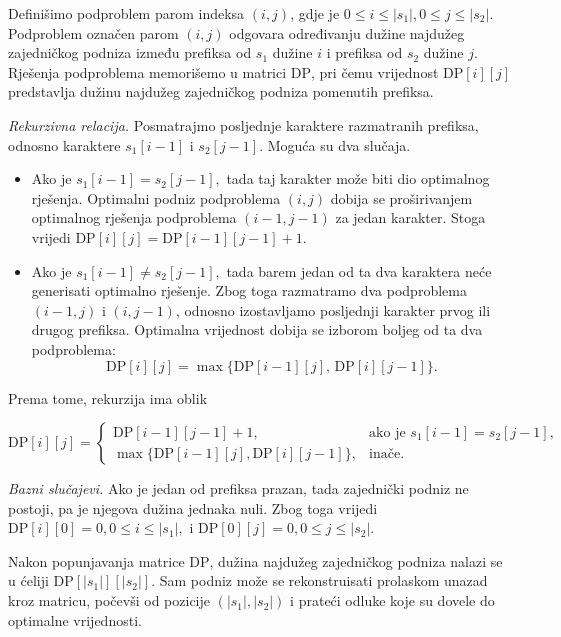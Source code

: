 \begin{solution}
	
	Definišimo podproblem parom indeksa $(i,j)$, gdje je
	$0 \leq i \leq |s_1|, 0 \leq j \leq |s_2|.
	$ 
	Podproblem označen parom $(i,j)$ odgovara određivanju dužine najdužeg zajedničkog podniza između prefiksa od $s_1$ dužine $i$ i prefiksa od $s_2$ dužine $j$.  Rješenja podproblema memorišemo u matrici $\textrm{DP}$, pri čemu vrijednost $\textrm{DP}[i][j]$ predstavlja dužinu najdužeg zajedničkog podniza pomenutih prefiksa.
	
	\medskip
	
	\textit{Rekurzivna relacija.} Posmatrajmo posljednje karaktere razmatranih prefiksa, odnosno karaktere $s_1[i-1]$ i $s_2[j-1]$. Moguća su dva slučaja.
	
	\begin{itemize}
		\item Ako je
		$s_1[i-1]=s_2[j-1],$
		tada taj karakter može biti dio optimalnog rješenja. Optimalni podniz podproblema $(i,j)$ dobija se proširivanjem optimalnog rješenja podproblema $(i-1,j-1)$ za jedan karakter. Stoga vrijedi $\textrm{DP}[i][j]=\textrm{DP}[i-1][j-1]+1.$
		
		\item Ako je $ s_1[i-1]\neq s_2[j-1],$
		tada barem jedan od ta dva karaktera neće generisati optimalno rješenje. Zbog toga razmatramo dva podproblema 
		$ (i-1,j)$ i
		$(i,j-1)$,
		odnosno izostavljamo posljednji karakter prvog ili drugog prefiksa. Optimalna vrijednost dobija se izborom boljeg od ta dva podproblema:
		$$ \textrm{DP}[i][j]
		=
		\max\{\textrm{DP}[i-1][j],\,\textrm{DP}[i][j-1]\}.
		$$
	\end{itemize}
	
	Prema tome, rekurzija ima oblik
	
	$
	\textrm{DP}[i][j]=
	\begin{cases}
		\textrm{DP}[i-1][j-1]+1, & \text{ako je } s_1[i-1]=s_2[j-1], \\
		\max\{\textrm{DP}[i-1][j],\textrm{DP}[i][j-1]\}, & \text{inače}.
	\end{cases}
	$
	
	\medskip
	
	\textit{Bazni slučajevi.} Ako je jedan od prefiksa prazan, tada zajednički podniz ne postoji, pa je njegova dužina jednaka nuli. Zbog toga vrijedi  $\textrm{DP}[i][0]=0,
	  0\leq i\leq |s_1|,$ i $
	\textrm{DP}[0][j]=0,
	0\leq j\leq |s_2|.$
	
	\medskip
	
	Nakon popunjavanja matrice $\textrm{DP}$, dužina najdužeg zajedničkog podniza nalazi se u ćeliji $\textrm{DP}[|s_1|][|s_2|].$ Sam podniz može se rekonstruisati prolaskom unazad kroz matricu, počevši od pozicije $(|s_1|,|s_2|)$ i prateći odluke koje su dovele do optimalne vrijednosti.
	
\end{solution}

